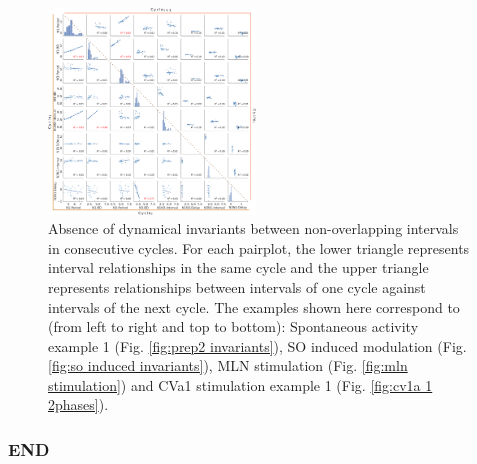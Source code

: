 \documentclass[aspectratio=43]{beamer}
\newcounter{mainframecount}
\begin{document}
\begin{frame}
\begin{figure}[htbp]
		\includegraphics[width=0.49\textwidth]{./invariants/data/SUSSEX/CV1a_driven1/images/2phases/output_pairplot_reset_triangle.png}
		\caption{Absence of dynamical invariants between non-overlapping intervals in consecutive cycles. For each pairplot, the lower triangle represents interval relationships in the same cycle and the upper triangle represents relationships between intervals of one cycle against  intervals of the next cycle. The examples shown here correspond to (from left to right and top to bottom): Spontaneous activity example 1 (Fig. \ref{fig:prep2 invariants}), SO induced modulation (Fig. \ref{fig:so induced invariants}), MLN stimulation (Fig. \ref{fig:mln stimulation}) and CVa1 stimulation example 1 (Fig. \ref{fig:cv1a 1 2phases}).}
		\label{fig:reset pairplot comparison}
	\end{figure}
\end{frame}

\begin{frame}
	\frametitle{END}
	\setcounter{framenumber}{\value{mainframecount}}  %

\end{frame}

\end{document}

